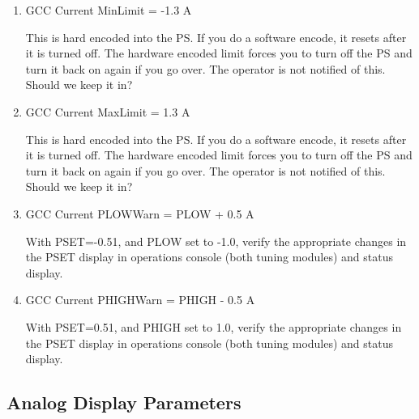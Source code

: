 \documentclass[11pt]{book}		%
\begin{document}
\begin{enumerate}
 \item GCC Current MinLimit = -1.3 A

\color{red}
This is hard encoded into the PS. If you do a software encode, it resets after it is turned off. The hardware encoded limit forces you to turn off the PS and turn it back on again if you go over. The operator is not notified of this. Should we keep it in?
\color{black}

 \item GCC Current MaxLimit = 1.3 A

\color{red}
This is hard encoded into the PS. If you do a software encode, it resets after it is turned off. The hardware encoded limit forces you to turn off the PS and turn it back on again if you go over. The operator is not notified of this. Should we keep it in?
\color{black}

 \item GCC Current PLOWWarn = PLOW + 0.5 A

\color{red}
With PSET=-0.51, and PLOW set to -1.0, verify the appropriate changes in the PSET display in operations console (both tuning modules) and status display.
\color{black}

 \item GCC Current PHIGHWarn = PHIGH - 0.5 A

\color{red}
With PSET=0.51, and PHIGH set to 1.0, verify the appropriate changes in the PSET display in operations console (both tuning modules) and status display.
\color{black}

\end{enumerate}

\subsection{Analog Display Parameters}
\end{document}
